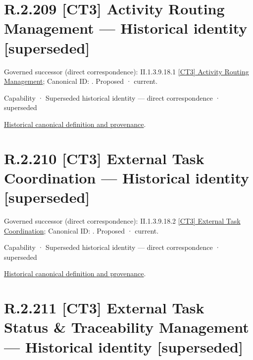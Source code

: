 \section*{R.2.209 [CT3] Activity Routing Management — Historical identity [superseded]}
\label{navigation:R.2.209}

{\small Governed successor (direct correspondence): II.1.3.9.18.1 \hyperref[element:27411c143e6e41ffba1af139fbbcd7e2]{[CT3] Activity Routing Management}; Canonical ID: \texttt{}. Proposed · current.}\par
\label{element:243ea93e7b7448fe97dc74f90bfc8946}
{\small Capability · Superseded historical identity — direct correspondence · superseded}\par
\href{../../../../../../../continuum/strategy/capability/243ea93e7b7448fe97dc74f90bfc8946.md}{Historical canonical definition and provenance}.\par
\section*{R.2.210 [CT3] External Task Coordination — Historical identity [superseded]}
\label{navigation:R.2.210}

{\small Governed successor (direct correspondence): II.1.3.9.18.2 \hyperref[element:ff3447c929724245a13ee864874b5561]{[CT3] External Task Coordination}; Canonical ID: \texttt{}. Proposed · current.}\par
\label{element:32be309d65594592bac4d7b068def0d2}
{\small Capability · Superseded historical identity — direct correspondence · superseded}\par
\href{../../../../../../../continuum/strategy/capability/32be309d65594592bac4d7b068def0d2.md}{Historical canonical definition and provenance}.\par
\section*{R.2.211 [CT3] External Task Status \& Traceability Management — Historical identity [superseded]}
\label{navigation:R.2.211}

